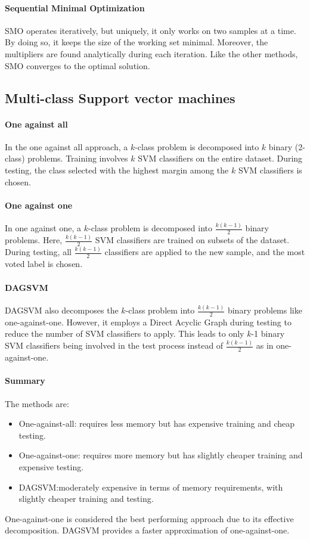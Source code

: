 \paragraph*{Sequential Minimal Optimization}
SMO operates iteratively, but uniquely, it only works on two samples at a time. 
By doing so, it keeps the size of the working set minimal. 
Moreover, the multipliers are found analytically during each iteration. Like the other methods, SMO converges to the optimal solution.

\subsection{Multi-class Support vector machines}
\paragraph*{One against all}
In the one against all approach, a $k$-class problem is decomposed into $k$ binary (2-class) problems. 
Training involves $k$ SVM classifiers on the entire dataset. 
During testing, the class selected with the highest margin among the $k$ SVM classifiers is chosen.

\paragraph*{One against one}
In one against one, a $k$-class problem is decomposed into $\frac{k(k-1)}{2}$ binary problems. 
Here, $\frac{k(k-1)}{2}$ SVM classifiers are trained on subsets of the dataset. 
During testing, all $\frac{k(k-1)}{2}$ classifiers are applied to the new sample, and the most voted label is chosen.

\paragraph*{DAGSVM}
DAGSVM also decomposes the $k$-class problem into $\frac{k(k-1)}{2}$ binary problems like one-against-one. 
However, it employs a Direct Acyclic Graph during testing to reduce the number of SVM classifiers to apply.
This leads to only $k$-1 binary SVM classifiers being involved in the test process instead of $\frac{k(k-1)}{2}$ as in one-against-one.

\paragraph*{Summary}
The methods are: 
\begin{itemize}
    \item One-against-all: requires less memory but has expensive training and cheap testing.
    \item One-against-one: requires more memory but has slightly cheaper training and expensive testing.
    \item DAGSVM:\@ moderately expensive in terms of memory requirements, with slightly cheaper training and testing.
\end{itemize}
One-against-one is considered the best performing approach due to its effective decomposition. 
DAGSVM provides a faster approximation of one-against-one.